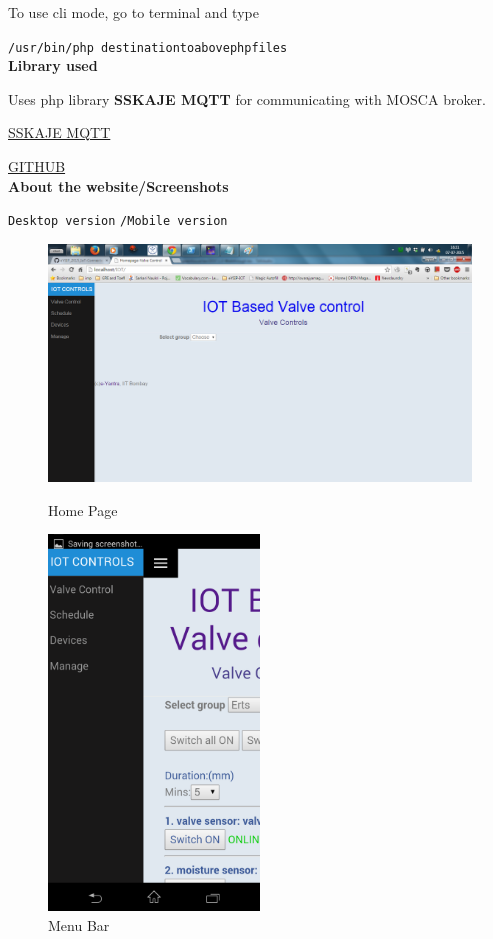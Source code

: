 \documentclass[16pt]{article}
\begin{document}
To use cli mode, go to terminal and type

\texttt{/usr/bin/php destinationtoabovephpfiles}\\

\textbf{Library used}

Uses php library \textbf{SSKAJE MQTT} for communicating with MOSCA
broker.

{\color{red}\href{https://sskaje.me}{SSKAJE MQTT}}

{\color{red}\href{https://github.com/sskaje/mqtt}{GITHUB}}\\
\textbf{About the website/Screenshots}

\texttt{Desktop version} \texttt{/Mobile version}

	\begin{figure}
		\includegraphics[width=1\textwidth]{images/homepage.png}
		\caption{Home Page}
			\includegraphics[width=0.5\textwidth]{images/menu.png}
			\caption{Menu Bar}	
	\end{figure}
	
\end{document}
